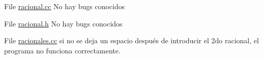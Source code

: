 
\begin{DoxyRefList}
\item[File \mbox{\hyperlink{racional_8cc}{racional.cc}} ]\label{bug__bug000003}%
%
No hay bugs conocidos 
\item[File \mbox{\hyperlink{racional_8h}{racional.h}} ]\label{bug__bug000004}%
%
No hay bugs conocidos 
\item[File \mbox{\hyperlink{racionales_8cc}{racionales.cc}} ]\label{bug__bug000005}%
%
si no se deja un espacio después de introducir el 2do racional, el programa no funciona correctamente.
\end{DoxyRefList}